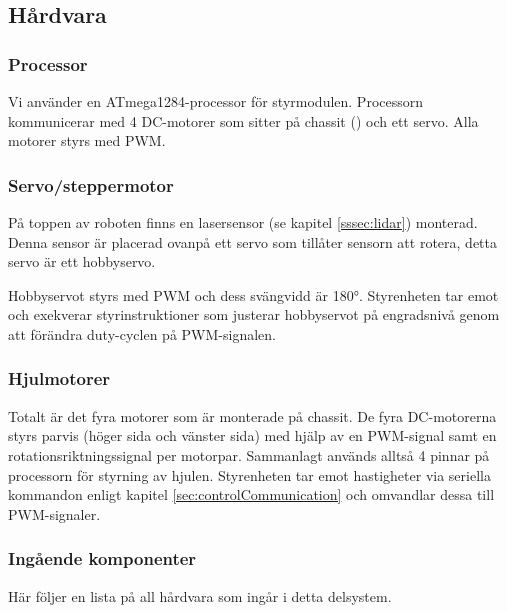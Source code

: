 \documentclass[a4paper,11pt]{article}
\begin{document}
\subsection{Hårdvara}

\subsubsection{Processor}
Vi använder en ATmega1284-processor för styrmodulen. Processorn kommunicerar med 4 DC-motorer som sitter på chassit (\cite{terminator}) och ett servo. Alla motorer styrs med PWM.

\subsubsection{Servo/steppermotor} 
\label{ssec:servomotor}
På toppen av roboten finns en lasersensor (se kapitel \ref{sssec:lidar}) monterad. Denna sensor är placerad ovanpå ett servo som tillåter sensorn att rotera, detta servo är ett hobbyservo.

Hobbyservot styrs med PWM och dess svängvidd är 180\si{\degree}. Styrenheten tar emot och exekverar styrinstruktioner som justerar hobbyservot på engradsnivå genom att förändra duty-cyclen på PWM-signalen.

\subsubsection{Hjulmotorer}
Totalt är det fyra motorer som är monterade på chassit. De fyra DC-motorerna styrs parvis (höger sida och vänster sida) med hjälp av en PWM-signal samt en rotationsriktningssignal per motorpar. Sammanlagt används alltså 4 pinnar på processorn för styrning av hjulen. Styrenheten tar emot hastigheter via seriella kommandon enligt kapitel \ref{sec:controlCommunication} och omvandlar dessa till PWM-signaler.

\subsubsection{Ingående komponenter}
Här följer en lista på all hårdvara som ingår i detta delsystem.

\begin{HardwareList}
\end{HardwareList}
\end{document}
